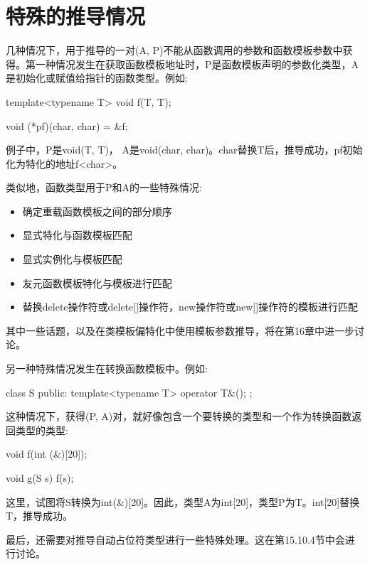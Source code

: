 \section{特殊的推导情况}
几种情况下，用于推导的一对(A, P)不能从函数调用的参数和函数模板参数中获得。第一种情况发生在获取函数模板地址时，P是函数模板声明的参数化类型，A是初始化或赋值给指针的函数类型。例如:

\begin{cpp}
template<typename T>
void f(T, T);

void (*pf)(char, char) = &f;
\end{cpp}

例子中，P是void(T, T)， A是void(char, char)。char替换T后，推导成功，pf初始化为特化的地址f<char>。

类似地，函数类型用于P和A的一些特殊情况:

\begin{itemize}
\item 
确定重载函数模板之间的部分顺序

\item 
显式特化与函数模板匹配

\item 
显式实例化与模板匹配

\item 
友元函数模板特化与模板进行匹配

\item 
替换delete操作符或delete[]操作符，new操作符或new[]操作符的模板进行匹配
\end{itemize}

其中一些话题，以及在类模板偏特化中使用模板参数推导，将在第16章中进一步讨论。

另一种特殊情况发生在转换函数模板中。例如:

\begin{cpp}
class S {
	public:
	template<typename T> operator T&();
};
\end{cpp}

这种情况下，获得(P, A)对，就好像包含一个要转换的类型和一个作为转换函数返回类型的类型:

\begin{cpp}
void f(int (&)[20]);

void g(S s)
{
	f(s);
}
\end{cpp}

这里，试图将S转换为int(\&)[20]。因此，类型A为int[20]，类型P为T。int[20]替换T，推导成功。

最后，还需要对推导自动占位符类型进行一些特殊处理。这在第15.10.4节中会进行讨论。


































